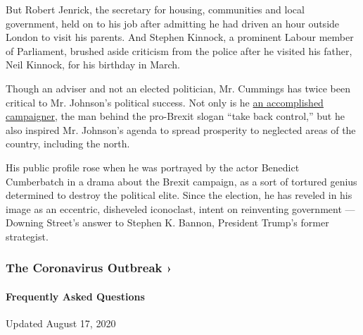 But Robert Jenrick, the secretary for housing, communities and local
government, held on to his job after admitting he had driven an hour
outside London to visit his parents. And Stephen Kinnock, a prominent
Labour member of Parliament, brushed aside criticism from the police
after he visited his father, Neil Kinnock, for his birthday in March.

Though an adviser and not an elected politician, Mr. Cummings has twice
been critical to Mr. Johnson's political success. Not only is he
\href{https://www.nytimes3xbfgragh.onion/2019/09/08/world/europe/dominic-cummings-brexit-boris-johnson.html}{an
accomplished campaigner}, the man behind the pro-Brexit slogan ``take
back control,'' but he also inspired Mr. Johnson's agenda to spread
prosperity to neglected areas of the country, including the north.

His public profile rose when he was portrayed by the actor Benedict
Cumberbatch in a drama about the Brexit campaign, as a sort of tortured
genius determined to destroy the political elite. Since the election, he
has reveled in his image as an eccentric, disheveled iconoclast, intent
on reinventing government --- Downing Street's answer to Stephen K.
Bannon, President Trump's former strategist.

\href{https://www.nytimes3xbfgragh.onion/news-event/coronavirus?action=click\&pgtype=Article\&state=default\&region=MAIN_CONTENT_3\&context=storylines_faq}{}

\hypertarget{the-coronavirus-outbreak-}{%
\subsubsection{The Coronavirus Outbreak
›}\label{the-coronavirus-outbreak-}}

\hypertarget{frequently-asked-questions}{%
\paragraph{Frequently Asked
Questions}\label{frequently-asked-questions}}

Updated August 17, 2020

